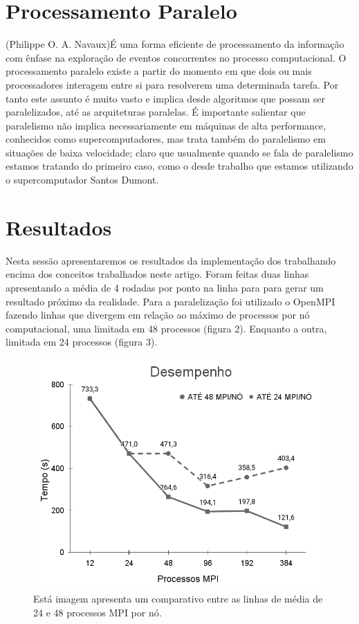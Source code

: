 \documentclass[12pt]{article}
\begin{document}
\section{Processamento Paralelo}
(Philippe O. A. Navaux)É uma forma eficiente de processamento da informação com ênfase na exploração de eventos concorrentes no processo computacional. 
O processamento paralelo existe a partir do momento em que dois ou mais processadores interagem entre si para resolverem uma determinada tarefa. Por tanto este assunto é muito vasto e implica desde algoritmos que possam ser paralelizados, até as arquiteturas paralelas. É importante salientar que paralelismo não implica necessariamente em máquinas de alta performance, conhecidos como supercomputadores, mas trata também do paralelismo em situações de baixa velocidade; claro que usualmente quando se fala de paralelismo estamos tratando do primeiro caso, como o desde trabalho que estamos utilizando o supercomputador Santos Dumont.


\section{Resultados}
Nesta sessão apresentaremos os resultados da implementação dos trabalhando encima dos conceitos trabalhados neste artigo.
Foram feitas duas linhas apresentando a média de 4 rodadas por ponto na linha para para gerar um resultado próximo da realidade.
Para a paralelização foi utilizado o OpenMPI fazendo linhas que divergem em relação ao máximo de processos por nó computacional, uma limitada em 48 processos (figura 2). Enquanto a outra, limitada em 24 processos (figura 3).

\begin{figure}[ht]
\centering
\includegraphics[width=.5\textwidth]{figures/perfpernode.png}
\caption{Está imagem apresenta um comparativo entre as linhas de média de 24 e 48 processos MPI por nó.}
\label{fig:48pernode}
\end{figure}
\end{document}
